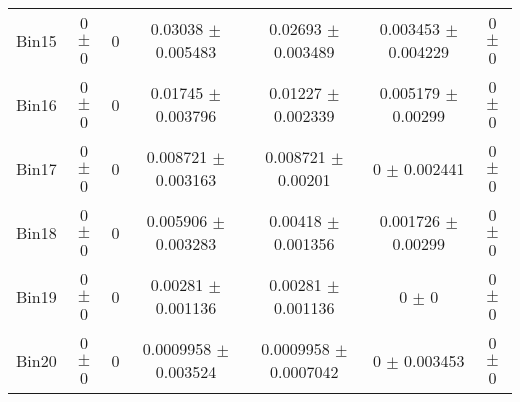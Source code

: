\begin{tabular}{@{\extracolsep{4pt}}lcccccc@{}}
     Bin15 & 0 $\pm$ 0 & 0 & 0.03038 $\pm$ 0.005483 & 0.02693 $\pm$ 0.003489 & 0.003453 $\pm$ 0.004229 & 0 $\pm$ 0 \\ 
     Bin16 & 0 $\pm$ 0 & 0 & 0.01745 $\pm$ 0.003796 & 0.01227 $\pm$ 0.002339 & 0.005179 $\pm$ 0.00299 & 0 $\pm$ 0 \\ 
     Bin17 & 0 $\pm$ 0 & 0 & 0.008721 $\pm$ 0.003163 & 0.008721 $\pm$ 0.00201 & 0 $\pm$ 0.002441 & 0 $\pm$ 0 \\ 
     Bin18 & 0 $\pm$ 0 & 0 & 0.005906 $\pm$ 0.003283 & 0.00418 $\pm$ 0.001356 & 0.001726 $\pm$ 0.00299 & 0 $\pm$ 0 \\ 
     Bin19 & 0 $\pm$ 0 & 0 & 0.00281 $\pm$ 0.001136 & 0.00281 $\pm$ 0.001136 & 0 $\pm$ 0 & 0 $\pm$ 0 \\ 
     Bin20 & 0 $\pm$ 0 & 0 & 0.0009958 $\pm$ 0.003524 & 0.0009958 $\pm$ 0.0007042 & 0 $\pm$ 0.003453 & 0 $\pm$ 0 \\ 
\hline\hline
  \end{tabular}
